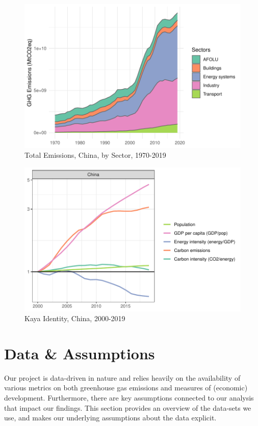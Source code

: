 \documentclass[
  12pt,
]{article}
\numberwithin{equation}{section}
\numberwithin{table}{section}
\numberwithin{figure}{section}
\begin{document}
\begin{figure}
\centering
\includegraphics{Paper_files/figure-latex/unnamed-chunk-2-1.pdf}
\caption{Total Emissions, China, by Sector, 1970-2019}
\end{figure}

\begin{figure}
\centering
\includegraphics{Paper_files/figure-latex/unnamed-chunk-3-1.pdf}
\caption{Kaya Identity, China, 2000-2019}
\end{figure}

\hypertarget{data-assumptions}{%
\section{Data \& Assumptions}\label{data-assumptions}}

Our project is data-driven in nature and relies heavily on the
availability of various metrics on both greenhouse gas emissions and
measures of (economic) development. Furthermore, there are key
assumptions connected to our analysis that impact our findings. This
section provides an overview of the data-sets we use, and makes our
underlying assumptions about the data explicit.
\end{document}
